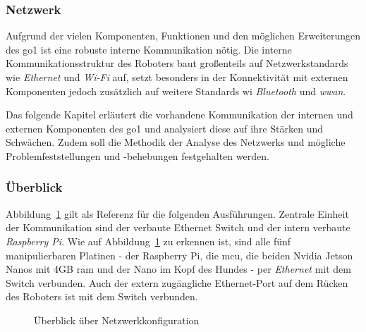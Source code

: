 \subsubsection{Netzwerk}

Aufgrund der vielen Komponenten, Funktionen und den möglichen Erweiterungen des \gls{go1} ist eine robuste interne Kommunikation nötig.
Die interne Kommunikationsstruktur des Roboters baut großenteils auf Netzwerkstandards wie \emph{Ethernet} und \emph{Wi-Fi} auf,
setzt besonders in der Konnektivität mit externen Komponenten jedoch zusätzlich auf weitere Standards wi \emph{Bluetooth} und \emph{\gls{wwan}}.

Das folgende Kapitel erläutert die vorhandene Kommunikation der internen und externen Komponenten des \gls{go1} und analysiert diese
auf ihre Stärken und Schwächen.
Zudem soll die Methodik der Analyse des Netzwerks und mögliche Problemfeststellungen und -behebungen festgehalten werden.

\subsubsection{Überblick}
\label{subsubsec:netzwerk_ueberblick}

Abbildung~\ref{fig:netzwerk_ueberblick} gilt als Referenz für die folgenden Ausführungen.
Zentrale Einheit der Kommunikation sind der verbaute Ethernet Switch  und
der intern verbaute \emph{Raspberry Pi}.
Wie auf Abbildung~\ref{fig:netzwerk_ueberblick} zu erkennen ist, sind alle fünf manipulierbaren Platinen -
der Raspberry Pi, die \gls{mcu}, die beiden Nvidia Jetson Nanos mit \num{4}GB \gls{ram} und der Nano im Kopf des Hundes -
per \emph{Ethernet} mit dem Switch verbunden.
Auch der extern zugängliche Ethernet-Port auf dem Rücken des Roboters ist mit dem Switch verbunden.

\begin{figure}[h]
    \caption{Überblick über Netzwerkkonfiguration}\label{fig:netzwerk_ueberblick}
\end{figure}

